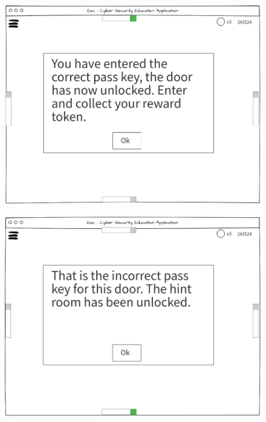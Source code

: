 \documentclass[12pt,a4paper]{article}
\begin{document}
\begin{figure}
\centering
\begin{minipage}{.5\textwidth}
  \centering
  \includegraphics[width=1\linewidth]{Figs/Ui_correct_response.PNG}
  \label{fig:test3}
\end{minipage}%
\begin{minipage}{.5\textwidth}
  \centering
  \includegraphics[width=1\linewidth]{Figs/Ui_incorrect_response.PNG}
  \label{fig:test4}
\end{minipage}
\end{figure}  
\end{document}
